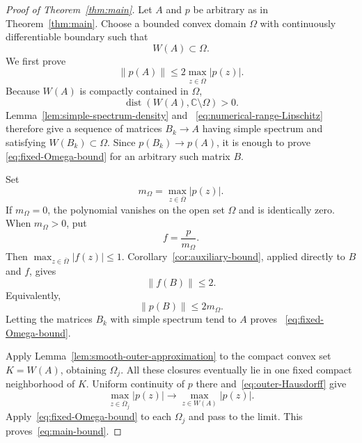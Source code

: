 \documentclass[preprints,article,submit,oneauthor]{Definitions/mdpi}
\theoremstyle{mdpi}
\theoremstyle{definition}
\newcommand{\C}{\mathbb C}
\newcommand{\distop}{\operatorname{dist}}
\begin{document}
\begin{proof}[Proof of Theorem~\ref{thm:main}]
Let $A$ and $p$ be arbitrary as in Theorem~\ref{thm:main}.  Choose a
bounded convex domain $\Omega$ with continuously differentiable boundary
such that
\begin{equation}
  W(A)\subset\Omega.
  \label{eq:WA-in-Omega}
\end{equation}
We first prove
\begin{equation}
  \lVert p(A)\rVert
  \leq2\max_{z\in\overline\Omega}\lvert p(z)\rvert.
  \label{eq:fixed-Omega-bound}
\end{equation}
Because $W(A)$ is compactly contained in $\Omega$,
\[
  \distop(W(A),\C\setminus\Omega)>0.
\]
Lemma~\ref{lem:simple-spectrum-density} and~%
\eqref{eq:numerical-range-Lipschitz} therefore give a sequence of
matrices $B_k\to A$ having simple spectrum and satisfying
$W(B_k)\subset\Omega$.  Since $p(B_k)\to p(A)$, it is enough to prove~%
\eqref{eq:fixed-Omega-bound} for an arbitrary such matrix $B$.

Set
\begin{equation}
  m_\Omega=\max_{z\in\overline\Omega}\lvert p(z)\rvert.
  \label{eq:m-Omega}
\end{equation}
If $m_\Omega=0$, the polynomial vanishes on the open set $\Omega$ and
is identically zero.  When $m_\Omega>0$, put
\begin{equation}
  f=\frac{p}{m_\Omega}.
  \label{eq:normalized-f}
\end{equation}
Then
$\max_{z\in\overline\Omega}\lvert f(z)\rvert\leq1$.
Corollary~\ref{cor:auxiliary-bound}, applied directly to $B$ and $f$,
gives
\[
  \lVert f(B)\rVert\leq2.
\]
Equivalently,
\begin{equation}
  \lVert p(B)\rVert\leq2m_\Omega.
  \label{eq:B-Omega-bound}
\end{equation}
Letting the matrices $B_k$ with simple spectrum tend to $A$ proves~%
\eqref{eq:fixed-Omega-bound}.

Apply Lemma~\ref{lem:smooth-outer-approximation} to the compact convex
set $K=W(A)$, obtaining $\Omega_j$.  All these closures eventually
lie in one fixed compact neighborhood of $K$.  Uniform continuity of
$p$ there and~\eqref{eq:outer-Hausdorff} give
\begin{equation}
  \max_{z\in\overline\Omega_j}\lvert p(z)\rvert
  \longrightarrow
  \max_{z\in W(A)}\lvert p(z)\rvert.
  \label{eq:maxima-converge}
\end{equation}
Apply~\eqref{eq:fixed-Omega-bound} to each $\Omega_j$ and pass to the
limit.  This proves~\eqref{eq:main-bound}.


\end{proof}
\end{document}
